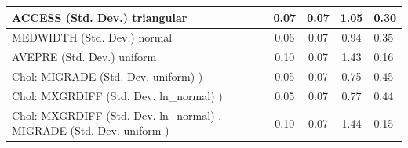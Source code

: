 \begin{table}
\begin{center}
\begin{tabular}{|l|l|c|c|c|l|}
			ACCESS (Std. Dev.) triangular &  & 0.07 & 0.07 & 1.05 & 0.30 \\
			\hline
			MEDWIDTH (Std. Dev.) normal &  & 0.06 & 0.07 & 0.94 & 0.35 \\
			\hline
			AVEPRE (Std. Dev.) uniform &  & 0.10 & 0.07 & 1.43 & 0.16 \\
			\hline
			 Chol: MIGRADE (Std. Dev. uniform) ) &  & 0.05 & 0.07 & 0.75 & 0.45 \\
			\hline
			 Chol: MXGRDIFF (Std. Dev. ln_normal) ) &  & 0.05 & 0.07 & 0.77 & 0.44 \\
			\hline
			 Chol: MXGRDIFF (Std. Dev. ln_normal) . MIGRADE (Std. Dev.   uniform ) &  & 0.10 & 0.07 & 1.44 & 0.15 \\
			\hline
		\end{tabular}
	\end{center}
\end{table}